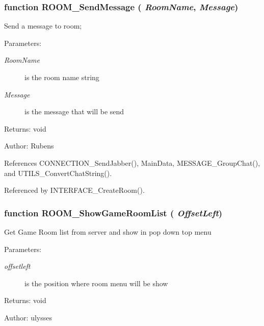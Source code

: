 \subsubsection{\setlength{\rightskip}{0pt plus 5cm}function ROOM\_\-SendMessage ( {\em RoomName}, \/   {\em Message})}\label{room_2room_8js_826f57caabe7d468297581a021fa17ef}


Send a message to room;

\begin{Desc}
\item[Parameters:]
\begin{description}
\item[{\em RoomName}]is the room name string \item[{\em Message}]is the message that will be send \end{description}
\end{Desc}
\begin{Desc}
\item[Returns:]void \end{Desc}
\begin{Desc}
\item[Author:]Rubens \end{Desc}


References CONNECTION\_\-SendJabber(), MainData, MESSAGE\_\-GroupChat(), and UTILS\_\-ConvertChatString().

Referenced by INTERFACE\_\-CreateRoom().
\subsubsection{\setlength{\rightskip}{0pt plus 5cm}function ROOM\_\-ShowGameRoomList ( {\em OffsetLeft})}\label{room_2room_8js_91d21a152f5e1de5e0414816d46e9a44}


Get Game Room list from server and show in pop down top menu

\begin{Desc}
\item[Parameters:]
\begin{description}
\item[{\em offsetleft}]is the position where room menu will be show \end{description}
\end{Desc}
\begin{Desc}
\item[Returns:]void \end{Desc}
\begin{Desc}
\item[Author:]ulysses \end{Desc}


